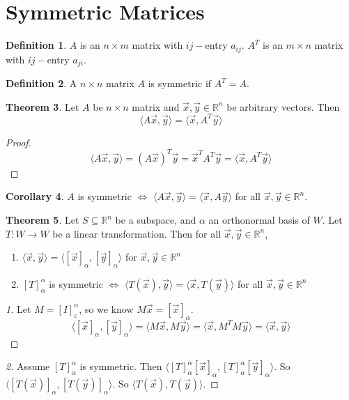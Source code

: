 \documentclass{article}
\theoremstyle{definition}
\newtheorem{theorem}{Theorem}[section]
\newtheorem{corollary}[theorem]{Corollary}
\newtheorem{definition}[theorem]{Definition}
\theoremstyle{remark}
\begin{document}
\section{Symmetric Matrices}

\begin{definition}
    $A$ is an $n\times m$ matrix with $ij-$entry $a_{ij}$.
    $A^T$ is an $m\times n$ matrix with $ij-$entry $a_{ji}$.
\end{definition}

\begin{definition}
    A $n\times n$ matrix $A$ is symmetric if $A^T=A$.
\end{definition}

\begin{theorem}
    Let $A$ be $n\times n$ matrix and $\vec{x},\vec{y}\in\mathbb{R}^n$ be arbitrary vectors.
    Then
    \[
    \langle A\vec{x},\vec{y}\rangle = \langle \vec{x},A^T\vec{y}\rangle
    \]
\end{theorem}

\begin{proof}
    \[
    \langle A\vec{x},\vec{y}\rangle=(A\vec{x})^T\vec{y}=\vec{x}^TA^T\vec{y}= \langle \vec{x},A^T\vec{y}\rangle
    \]
\end{proof}

\begin{corollary}
    $A$ is symmetric $\iff$ $\langle A\vec{x},\vec{y}\rangle = \langle \vec{x},A\vec{y}\rangle$ for all $\vec{x},\vec{y}\in\mathbb{R}^n$.
\end{corollary}

\begin{theorem}
    Let $S\subseteq\mathbb{R}^n$ be a subspace, and $\alpha$ an orthonormal basis of $W$.
    Let $T:W\rightarrow W$ be a linear transformation.
    Then for all $\vec{x},\vec{y}\in\mathbb{R}^n$,
    \begin{enumerate}
        \item $\langle \vec{x},\vec{y}\rangle=\langle [\vec{x}]_{\alpha},[\vec{y}]_{\alpha}\rangle$ for $\vec{x},\vec{y}\in\mathbb{R}^n$
        \item $[T]^{\alpha}_{\alpha}$ is symmetric $\iff$ $\langle T(\vec{x}),\vec{y}\rangle = \langle \vec{x},T(\vec{y})\rangle$ for all $\vec{x},\vec{y}\in\mathbb{R}^n$
    \end{enumerate}
\end{theorem}

\begin{proof}[1]
    Let $M=[I]_{\varepsilon}^{\alpha}$, so we know $M\vec{x}=[\vec{x}]_{\alpha}$.
    \[
    \langle [\vec{x}]_{\alpha},[\vec{y}]_{\alpha}\rangle= \langle M\vec{x},M\vec{y}\rangle=\langle \vec{x},M^T M\vec{y}\rangle=\langle \vec{x},\vec{y}\rangle
    \]
\end{proof}
\begin{proof}[2]
    Assume $[T]^{\alpha}_{\alpha}$ is symmetric.
    Then $\langle [T]^{\alpha}_{\alpha}[\vec{x}]_{\alpha},[T]^{\alpha}_{\alpha}[\vec{y}]_{\alpha}\rangle$.
    So $\langle [T(\vec{x})]_{\alpha},[T(\vec{y})]_{\alpha}\rangle$.
    So $\langle T(\vec{x}),T(\vec{y})\rangle$.
\end{proof}
\end{document}

